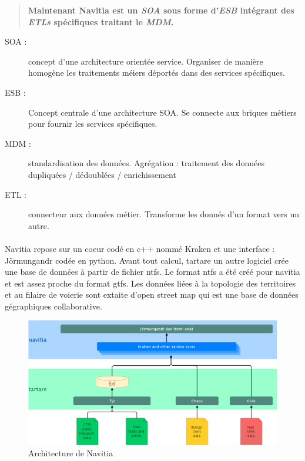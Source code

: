\documentclass[a4paper]{report}
\begin{document}
\begin{quote}
	\textbf{Maintenant Navitia est un \emph{SOA} sous forme d'\emph{ESB} intégrant des \emph{ETLs} spécifiques traitant le \emph{MDM}.}
\end{quote}
\begin{description}
	\item[SOA :] concept d'une architecture orientée service. Organiser de manière homogène les traitements méiers déportés dans des services spécifiques.
	\item[ESB :] Concept centrale d'une architecture SOA. Se connecte aux briques métiers pour fournir les services spécifiques.
	\item[MDM :] standardisation des données. Agrégation : traitement des données dupliquées / dédoublées / enrichissement
	\item[ETL :] connecteur aux données métier. Transforme les donnés d'un format vers un autre.
\end{description}

\paragraph{}Navitia repose sur un coeur codé en c++ nommé Kraken et une interface : Jörmungandr codée en python. Avant tout calcul, tartare un autre logiciel crée une base de données à partir de fichier ntfs. Le format ntfs a été créé pour navitia et est assez proche du format gtfs. Les données liées à la topologie des territoires et au filaire de voierie sont extaite d'open street map qui est une base de données gégraphiques collaborative.

\begin{figure}[H]
	\begin{center}
		\includegraphics[width=400pt]{image/architecture_navitia}
		\caption{Architecture de Navitia}
		\label{Architecture de Navitia}
	\end{center}
\end{figure}
\end{document}
